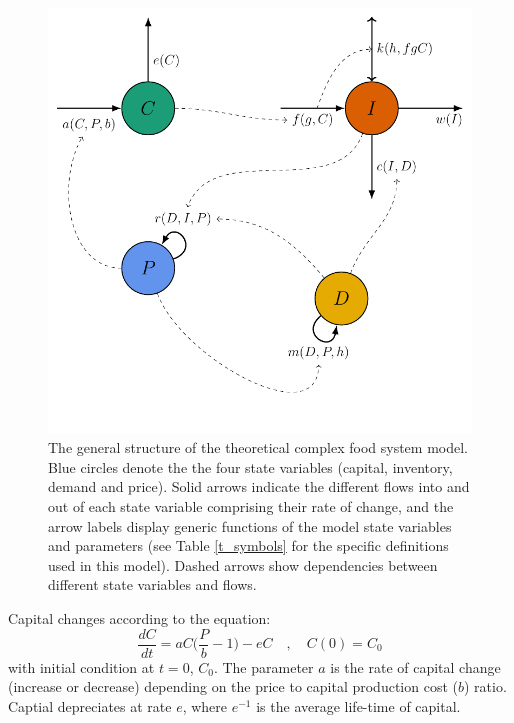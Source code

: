 \documentclass[12pt]{article}
\begin{document}
\begin{figure}[t!]
  \centering
  \includegraphics[scale=1]{figure_1.pdf}
  \caption{The general structure of the theoretical complex food system model. Blue circles denote the the four state variables (capital, inventory, demand and price). Solid arrows indicate the different flows into and out of each state variable comprising their rate of change, and the arrow labels display generic functions of the model state variables and parameters (see Table \ref{t_symbols} for the specific definitions used in this model). Dashed arrows show dependencies between different state variables and flows.}
  \label{fig_cfs}
\end{figure}

Capital changes according to the equation:
%
\begin{equation}
  \frac{dC}{dt} = a C \Big(\frac{P}{b} - 1\Big) - e C \quad, \quad C(0) = C_0
  \label{eq_capital}
\end{equation}
%
with initial condition at $t = 0$, $C_0$. The parameter $a$ is the rate of capital change (increase or decrease) depending on the price to capital production cost ($b$) ratio. Captial depreciates at rate $e$, where $e^{-1}$ is the average life-time of capital.
\end{document}
